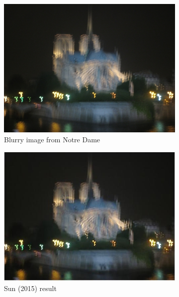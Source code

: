 \documentclass[10pt,twocolumn,letterpaper]{article}
\begin{document}
\begin{figure}
\begin{center}
\graphicspath{ {deblursun/} }
\begin{subfigure}{0.45\textwidth}

\includegraphics[width=0.9\linewidth]{notredame_s01_it0000_blurry} 
\caption{Blurry image from Notre Dame}
\label{fig:subim95}
\end{subfigure}
\begin{subfigure}{0.45\textwidth}
\includegraphics[width=0.9\linewidth]{notredame_deblurred}
\caption{Sun \etal (2015) result}
\label{fig:subim105}
\end{subfigure}
\begin{subfigure}{0.45\textwidth}

\end{subfigure}
\end{center}
\end{figure}
\end{document}
